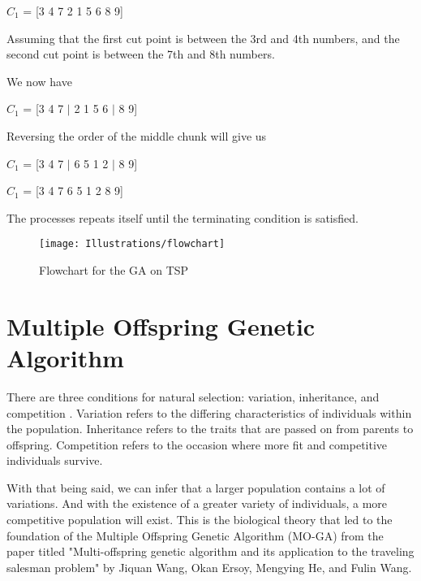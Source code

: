 $C_{1}$ = [3 4 7 2 1 5 6 8 9] \par 

\hfill \par 
Assuming that the first cut point is between the 3rd and 4th numbers, and the second cut point is between the 7th and 8th numbers. \par 

We now have \par 
\hfill \par 
$C_{1}$ = [3 4 7 $|$ 2 1 5 6 $|$ 8 9] \par 

\hfill \par 

Reversing the order of the middle chunk will give us \par 

\hfill \par 

$C_{1}$ = [3 4 7 $|$ 6 5 1 2 $|$ 8 9] \par 
$C_{1}$ = [3 4 7 6 5 1 2 8 9] \par 

\hfill \par 

The processes repeats itself until the terminating condition is satisfied. 

\begin{figure}[H]
	\caption{Flowchart for the GA on TSP}
	\texttt{[image: Illustrations/flowchart]}
	\centering
\end{figure}

\section{Multiple Offspring Genetic Algorithm} \label{MOGA}
\indent \indent There are three conditions for natural selection: variation, inheritance, and competition \cite{godfrey2007conditions}. {Variation} refers to the differing characteristics of individuals within the population. {Inheritance} refers to the traits that are passed on from parents to offspring. {Competition} refers to the occasion where more fit and competitive individuals survive. \par 

With that being said, we can infer that a larger population contains a lot of variations. And with the existence of a greater variety of individuals, a more competitive population will exist. This is the biological theory that led to the foundation of the  {Multiple Offspring Genetic Algorithm} (MO-GA) from the paper titled "Multi-offspring genetic algorithm and its application to the traveling salesman problem" by Jiquan Wang, Okan Ersoy, Mengying He, and Fulin Wang. \par 

